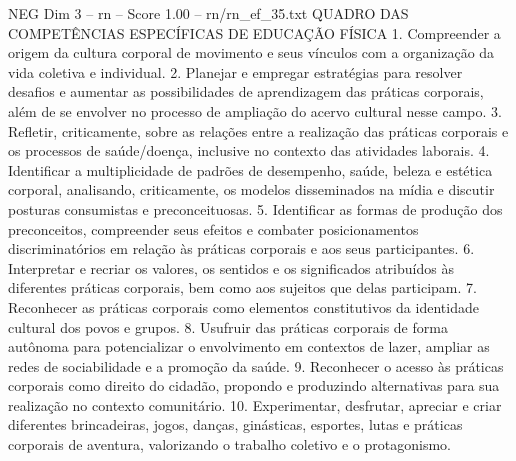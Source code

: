 \begin{textsample}{NEG Dim 3 – rn – Score 1.00 – rn/rn\_ef\_35.txt}  \label{ex:f3_neg_194}
QUADRO DAS COMPETÊNCIAS ESPECÍFICAS DE EDUCAÇÃO FÍSICA 1.
Compreender a origem da cultura corporal de movimento e seus vínculos com a organização da vida coletiva e individual. 2.
Planejar e empregar estratégias para resolver desafios e aumentar as possibilidades de aprendizagem das práticas corporais, além de se envolver no processo de ampliação do acervo cultural nesse campo. 3.
Refletir, criticamente, sobre as relações entre a realização das práticas corporais e os processos de saúde/doença, inclusive no contexto das atividades laborais. 4.
Identificar a multiplicidade de padrões de desempenho, saúde, beleza e estética corporal, analisando, criticamente, os modelos disseminados na mídia e discutir posturas consumistas e preconceituosas. 5.
Identificar as formas de produção dos preconceitos, compreender seus efeitos e combater posicionamentos discriminatórios em relação às práticas corporais e aos seus participantes. 6.
Interpretar e recriar os valores, os sentidos e os significados atribuídos às diferentes práticas corporais, bem como aos sujeitos que delas participam. 7.
Reconhecer as práticas corporais como elementos constitutivos da identidade cultural dos povos e grupos. 8.
Usufruir das práticas corporais de forma autônoma para potencializar o envolvimento em contextos de lazer, ampliar as redes de sociabilidade e a promoção da saúde. 9.
Reconhecer o acesso às práticas corporais como direito do cidadão, propondo e produzindo alternativas para sua realização no contexto comunitário. 10.
Experimentar, desfrutar, apreciar e criar diferentes brincadeiras, jogos, danças, ginásticas, esportes, lutas e práticas corporais de aventura, valorizando o trabalho coletivo e o protagonismo.

\end{textsample}
